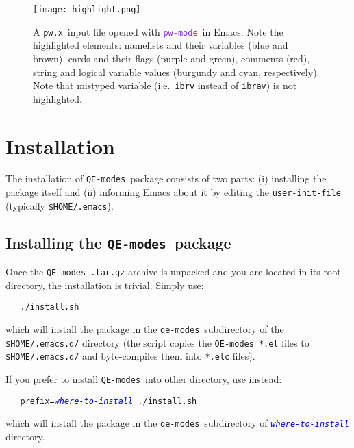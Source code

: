 \documentclass[12pt,a4paper]{article}
\def\pwx{\texttt{pw.x}}
\def\QEmodes{\texttt{QE-modes}}
\def\qemodes{\texttt{qe-modes}}
\def\efn#1{\textcolor{BlueViolet}{\texttt{#1}}}
\def\var#1{\textcolor{Blue}{\texttt{\textit{#1}}}}
\def\pwmode{\efn{pw-mode}}
\begin{document}
\begin{figure}[htb]
  \centering
  \texttt{[image: highlight.png]}
  \caption{A \pwx\ input file opened with \pwmode\ in Emacs. Note the
    highlighted elements: namelists and their variables (blue and
    brown), cards and their flags (purple and green), comments (red),
    string and logical variable values (burgundy and cyan,
    respectively). Note that mistyped variable (i.e.\ \texttt{ibrv}
    instead of \texttt{ibrav}) is not highlighted.}
  \label{fig:example}
\end{figure}
    
\section{Installation}

The installation of \QEmodes\ package consists of two parts: (i)
installing the package itself and (ii) informing Emacs about it by
editing the \verb+user-init-file+ (typically \verb+$HOME/.emacs+).

\subsection{Installing the \QEmodes\ package}
Once the \texttt{QE-modes-\version.tar.gz} archive is unpacked and you
are located in its root directory, the installation is trivial. Simply use:
\begin{verbatim}
   ./install.sh
\end{verbatim}
which will install the package in the \qemodes\ subdirectory of the
\texttt{\$HOME/.emacs.d/} directory (the script copies the \QEmodes\
\texttt{*.el} files to \texttt{\$HOME/.emacs.d/} and byte-compiles
them into \texttt{*.elc} files).

If you prefer to install \QEmodes\ into other directory, use instead:
\begin{flushleft}
\verb+   prefix=+\var{where-to-install}\verb+ ./install.sh+
\end{flushleft}
which will install the package in the \qemodes\ subdirectory of
\var{where-to-install} directory.

\end{document}
